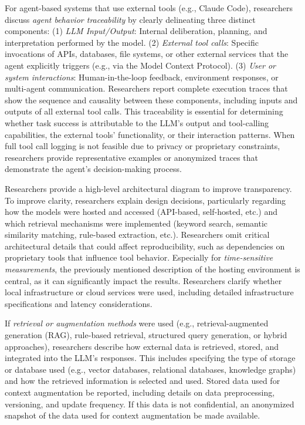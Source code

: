 For agent-based systems that use external tools (e.g., Claude Code), researchers \must discuss \emph{agent behavior traceability} by clearly delineating three distinct components: (1) \emph{LLM Input/Output}: Internal deliberation, planning, and interpretation performed by the model. (2) \emph{External tool calls}: Specific invocations of APIs, databases, file systems, or other external services that the agent explicitly triggers (e.g., via the Model Context Protocol). (3) \emph{User or system interactions}: Human-in-the-loop feedback, environment responses, or multi-agent communication.
Researchers \should report complete execution traces that show the sequence and causality between these components, including inputs and outputs of all external tool calls.
This traceability is essential for determining whether task success is attributable to the LLM's output and tool-calling capabilities, the external tools' functionality, or their interaction patterns.
When full tool call logging is not feasible due to privacy or proprietary constraints, researchers \should provide representative examples or anonymized traces that demonstrate the agent's decision-making process.

Researchers \should provide a high-level architectural diagram to improve transparency.
To improve clarity, researchers \should explain design decisions, particularly regarding how the models were hosted and accessed (API-based, self-hosted, etc.) and which retrieval mechanisms were implemented (keyword search, semantic similarity matching, rule-based extraction, etc.).
Researchers \mustnot omit critical architectural details that could affect reproducibility, such as dependencies on proprietary tools that influence tool behavior. 
Especially for \emph{time-sensitive measurements}, the previously mentioned description of the hosting environment is central, as it can significantly impact the results.
Researchers \must clarify whether local infrastructure or cloud services were used, including detailed infrastructure specifications and latency considerations.

If \emph{retrieval or augmentation methods} were used (e.g., retrieval-augmented generation (RAG), rule-based retrieval, structured query generation, or hybrid approaches), researchers \must describe how external data is retrieved, stored, and integrated into the LLM's responses.
This includes specifying the type of storage or database used (e.g., vector databases, relational databases, knowledge graphs) and how the retrieved information is selected and used.
Stored data used for context augmentation \must be reported, including details on data preprocessing, versioning, and update frequency.
If this data is not confidential, an anonymized snapshot of the data used for context augmentation \should be made available.

